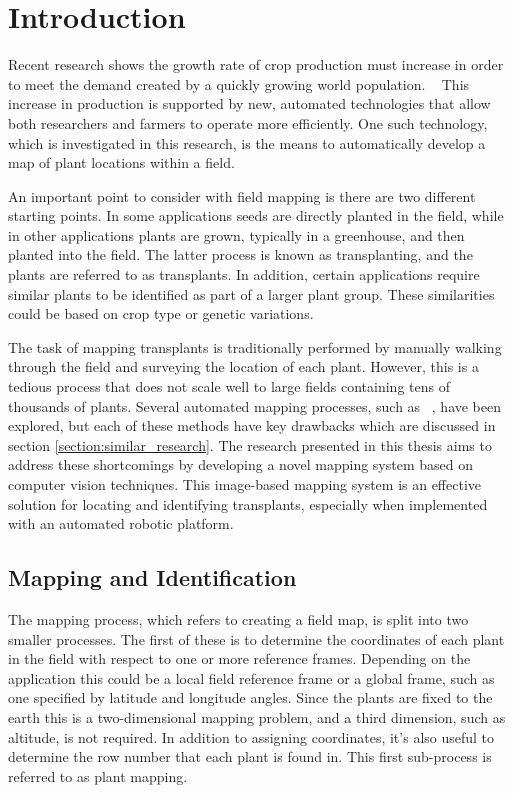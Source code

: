 
\cleardoublepage

\chapter{Introduction}
\label{introduction}

Recent research shows the growth rate of crop production must increase in order to meet the demand created by a quickly growing world population. ~\citep{tester:2010}  This increase in production is supported by new, automated technologies that allow both researchers and farmers to operate more efficiently. One such technology, which is investigated in this research, is the means to automatically develop a map of plant locations within a field. 
 
An important point to consider with field mapping is there are two different starting points.  In some applications seeds are directly planted in the field, while in other applications plants are grown, typically in a greenhouse, and then planted into the field.  The latter process is known as transplanting, and the plants are referred to as transplants.  In addition, certain applications require similar plants to be identified as part of a larger plant group.  These similarities could be based on crop type or genetic variations. 

The task of mapping transplants is traditionally performed by manually walking through the field and surveying the location of each plant. However, this is a tedious process that does not scale well to large fields containing tens of thousands of plants.  Several automated mapping processes, such as ~\citep{Perez-Ruiz:2012}, have been explored, but each of these methods have key drawbacks which are discussed in section \ref{section:similar_research}.  The research presented in this thesis aims to address these shortcomings by developing a novel mapping system based on computer vision techniques.  This image-based mapping system is an effective solution for locating and identifying transplants, especially when implemented with an automated robotic platform. 

\section{Mapping and Identification}

The mapping process, which refers to creating a field map, is split into two smaller processes.  The first of these is to determine the coordinates of each plant in the field with respect to one or more reference frames.  Depending on the application this could be a local field reference frame or a global frame, such as one specified by latitude and longitude angles.  Since the plants are fixed to the earth this is a two-dimensional mapping problem, and a third dimension, such as altitude, is not required.  In addition to assigning coordinates, it's also useful to determine the row number that each plant is found in.  This first sub-process is referred to as plant mapping. 

